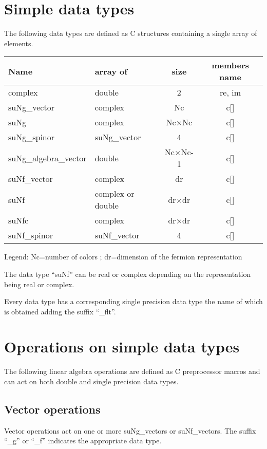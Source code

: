 \documentclass[10pt]{article}
\begin{document}
\section{Simple data types}

The following data types are defined as C structures containing a single array of elements.

\begin{center}
\begin{tabular}{llcc}
\hline
Name & array of & size & members name \\  
\hline
\hline
complex & double & 2 & re, im \\
\hline
suNg\_vector & complex & Nc & c[]\\
suNg & complex & Nc$\times$Nc & c[]\\
suNg\_spinor & suNg\_vector  & 4 & c[]\\
suNg\_algebra\_vector & double & Nc$\times$Nc-1 & c[]\\
\hline
suNf\_vector & complex & dr & c[]\\
suNf & complex or double & dr$\times$dr & c[]\\
suNfc & complex & dr$\times$dr & c[]\\
suNf\_spinor & suNf\_vector  & 4 & c[]
\end{tabular}
\end{center}
Legend: Nc=number of colors ; dr=dimension of the fermion representation

The data type ``suNf'' can be real or complex depending on the representation being real or complex.

Every data type has a corresponding single precision data type the name of which is obtained adding the suffix ``\_flt''. 


\section{Operations on simple data types}
The following linear algebra operations are defined as C preprocessor macros and can act on both double and single precision data types.

\subsection{Vector operations\label{vop}}

Vector operations act on one or more suNg\_vectors or suNf\_vectors. The suffix ``\_g'' or ``\_f'' indicates the appropriate data type.\\
\end{document}
